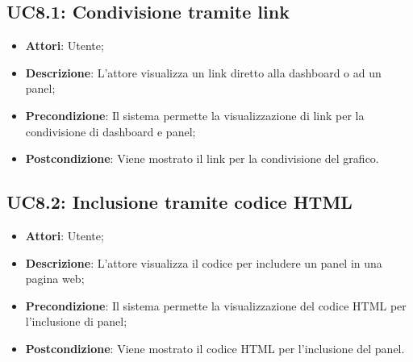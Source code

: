 \subsection{UC8.1: Condivisione tramite link}
\hypertarget{UC8.1}{}
\begin{itemize}
	\item \textbf{Attori}: Utente;
	\item \textbf{Descrizione}: L'attore visualizza un link diretto alla dashboard o ad un panel;
	\item \textbf{Precondizione}: Il sistema permette la visualizzazione di link per la condivisione di dashboard e panel;
	\item \textbf{Postcondizione}: Viene mostrato il link per la condivisione del grafico.
\end{itemize}

\subsection{UC8.2: Inclusione tramite codice HTML}
\hypertarget{UC8.2}{}
\begin{itemize}
	\item \textbf{Attori}: Utente;
	\item \textbf{Descrizione}: L'attore visualizza il codice  per includere un panel in una pagina web;
	\item \textbf{Precondizione}: Il sistema permette la visualizzazione del codice HTML per l'inclusione di panel;
	\item \textbf{Postcondizione}: Viene mostrato il codice HTML per l'inclusione del panel.
\end{itemize}


